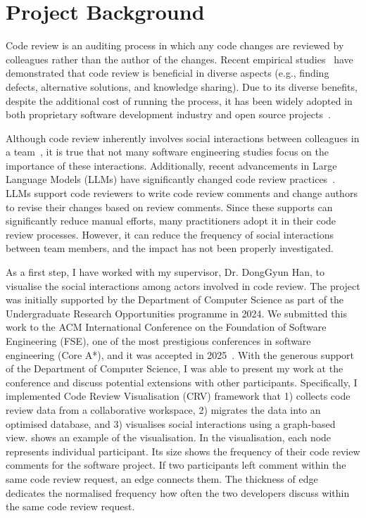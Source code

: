 \documentclass[letterpaper]{article}
\begin{document}
\section{Project Background}
Code review is an auditing process in which any code changes are reviewed by colleagues rather than the author of the changes.
Recent empirical studies~\cite{Bacchelli13,Mcintosh16} have demonstrated that code review is beneficial in diverse aspects (e.g., finding defects, alternative solutions, and knowledge sharing).
Due to its diverse benefits, despite the additional cost of running the process, it has been widely adopted in both proprietary software development industry and open source projects~\cite{Sadowski18, Mukadam13}.

Although code review inherently involves social interactions between colleagues in a team~\cite{Bosu17,Toufique17}, it is true that not many software engineering studies focus on the importance of these interactions. 
Additionally, recent advancements in Large Language Models (LLMs) have significantly changed code review practices~\cite{Zhou23icpc}.
LLMs support code reviewers to write code review comments and change authors to revise their changes based on review comments. 
Since these supports can significantly reduce manual efforts, many practitioners adopt it in their code review processes.
However, it can reduce the frequency of social interactions between team members, and the impact has not been properly investigated.

As a first step, I have worked with my supervisor, Dr. DongGyun Han, to visualise the social interactions among actors involved in code review.
The project was initially supported by the Department of Computer Science as part of the Undergraduate Research Opportunities programme in 2024.
We submitted this work to the ACM International Conference on the Foundation of Software Engineering (FSE), one of the most prestigious conferences in software engineering (Core A*), and it was accepted in 2025~\cite{Bee25}.
With the generous support of the Department of Computer Science, I was able to present my work at the conference and discuss potential extensions with other participants.
Specifically, I implemented Code Review Visualisation (CRV) framework that 1) collects code review data from a collaborative workspace, 2) migrates the data into an optimised database, and 3) visualises social interactions using a graph-based view.
 shows an example of the visualisation.
In the visualisation, each node represents individual participant.
Its size shows the frequency of their code review comments for the software project.
If two participants left comment within the same code review request, an edge connects them.
The thickness of edge dedicates the normalised frequency how often the two developers discuss within the same code review request.
\end{document}

